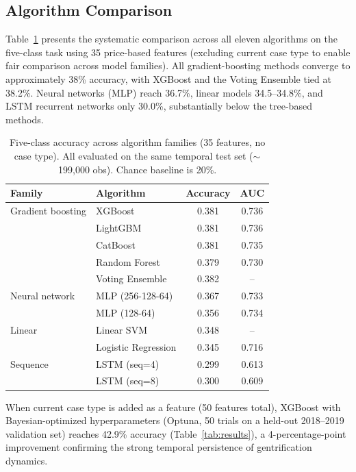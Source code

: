 \documentclass[12pt,a4paper]{article}
\begin{document}
\subsection{Algorithm Comparison}

Table~\ref{tab:algorithms} presents the systematic comparison across all eleven algorithms on the five-class task using 35 price-based features (excluding current case type to enable fair comparison across model families). All gradient-boosting methods converge to approximately 38\% accuracy, with XGBoost and the Voting Ensemble tied at 38.2\%. Neural networks (MLP) reach 36.7\%, linear models 34.5--34.8\%, and LSTM recurrent networks only 30.0\%, substantially below the tree-based methods.

\begin{table}[H]
\centering
\caption{Five-class accuracy across algorithm families (35 features, no case type). All evaluated on the same temporal test set (${\sim}$199,000 obs). Chance baseline is 20\%.}
\label{tab:algorithms}
\begin{tabular}{llcc}
\toprule
\textbf{Family} & \textbf{Algorithm} & \textbf{Accuracy} & \textbf{AUC} \\
\midrule
Gradient boosting & XGBoost & 0.381 & 0.736 \\
                  & LightGBM & 0.381 & 0.736 \\
                  & CatBoost & 0.381 & 0.735 \\
                  & Random Forest & 0.379 & 0.730 \\
                  & Voting Ensemble & 0.382 & -- \\
\midrule
Neural network    & MLP (256-128-64) & 0.367 & 0.733 \\
                  & MLP (128-64) & 0.356 & 0.734 \\
\midrule
Linear            & Linear SVM & 0.348 & -- \\
                  & Logistic Regression & 0.345 & 0.716 \\
\midrule
Sequence          & LSTM (seq=4) & 0.299 & 0.613 \\
                  & LSTM (seq=8) & 0.300 & 0.609 \\
\bottomrule
\end{tabular}
\end{table}

When current case type is added as a feature (50 features total), XGBoost with Bayesian-optimized hyperparameters (Optuna, 50 trials on a held-out 2018--2019 validation set) reaches 42.9\% accuracy (Table~\ref{tab:results}), a 4-percentage-point improvement confirming the strong temporal persistence of gentrification dynamics.
\end{document}
